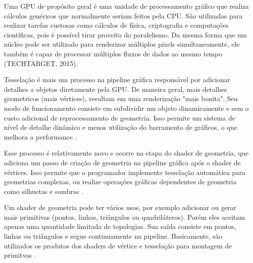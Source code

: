 Uma GPU de propósito geral é uma unidade de processamento gráfico que realiza cálculos genéricos que normalmente seriam feitos pela CPU. São utilizadas para realizar tarefas custosas como cálculos de física, criptografia e computações científicas, pois é possível tirar proveito do paralelismo. Da mesma forma que um núcleo pode ser utilizado para renderizar múltiplos pixels simultaneamente, ele também é capaz de processar múltiplos fluxos de dados ao mesmo tempo (TECHTARGET, 2015)\nocite{GPGPU}.

\begin{figure}[h!]
	\centering
\end{figure}
\nocite{tesselation}

Tesselação é mais um processo na pipeline gráfica responsável por adicionar detalhes a objetos diretamente pela GPU. De maneira geral, mais detalhes geometricos (mais vértices), resultam em uma renderização "mais bonita". Seu modo de funcionamento consiste em subdividir um objeto dinamicamente e sem o custo adicional de reprocessamento de geometria. Isso permite um sistema de nível de detalhe dinâmico e menos utilização do barramento de gráficos, o que melhora a performance \cite{HLSLBook}.

Esse processo é relativamente novo e ocorre na etapa do shader de geometria, que adiciona um passo de criação de geometria na pipeline gráfica após o shader de vértices. Isso permite que o programador implemente tesselação automática para geometrias complexas, ou realize operações gráficas dependentes de geometria como silhuetas e sombras \cite{bailey2007}.

Um shader de geometria pode ter vários usos, por exemplo adicionar ou gerar mais primitivas (pontos, linhas, triângulos ou quadriláteros). Porém eles aceitam apenas uma quantidade limitada de topologias. Sua saída consiste em pontos, linhas ou triângulos e segue continuamente na pipeline. Basicamente, são utilizados os produtos dos shaders de vértice e tesselação para montagem de primitvas \cite{hasu2018modern}.  


